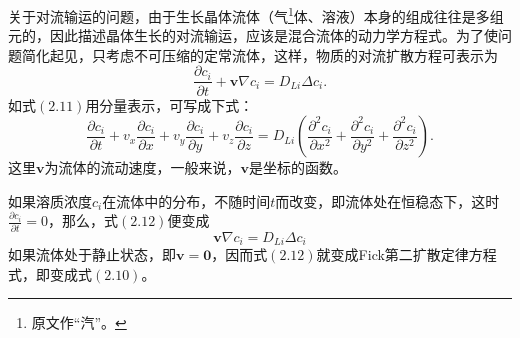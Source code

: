关于对流输运的问题，由于生长晶体流体（气\footnote{原文作“汽”。}体、溶液）本身的组成往往是多组元的，因此描述晶体生长的对流输运，应该是混合流体的动力学方程式。为了使问题简化起见，只考虑不可压缩的定常流体，这样，物质的对流扩散方程可表示为
\begin{equation}
\frac{\partial c_i}{\partial t}+\bm{v}\nabla c_i=D_{Li}\Delta c_i.
\end{equation}
如式$(2.11)$用分量表示，可写成下式：
\begin{equation}
\frac{\partial c_i}{\partial t}+v_x\frac{\partial c_i}{\partial x}+v_y\frac{\partial c_i}{\partial y}+v_z\frac{\partial c_i}{\partial z}=D_{Li}(\frac{\partial^2c_i}{\partial x^2}+\frac{\partial^2c_i}{\partial y^2}+\frac{\partial^2c_i}{\partial z^2}).
\end{equation}
这里$\bm{v}$为流体的流动速度，一般来说，$\bm{v}$是坐标的函数。

如果溶质浓度$c_i$在流体中的分布，不随时间$t$而改变，即流体处在恒稳态下，这时$\frac{\partial c_i}{\partial t}=0$，那么，式$(2.12)$便变成
\begin{equation}
\bm{v}\nabla c_i=D_{Li}\Delta c_i
\end{equation}
如果流体处于静止状态，即$\bm{v}=\bm{0}$，因而式$(2.12)$就变成Fick第二扩散定律方程式，即变成式$(2.10)$。

